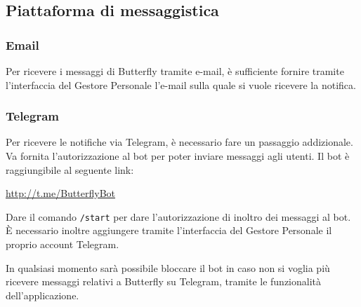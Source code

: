 \subsection{Piattaforma di messaggistica}

\subsubsection{Email}

Per ricevere i messaggi di Butterfly tramite e-mail, è sufficiente fornire tramite l'interfaccia del Gestore Personale l'e-mail sulla
quale si vuole ricevere la notifica.

\subsubsection{Telegram}

Per ricevere le notifiche via Telegram, è necessario fare un passaggio addizionale. Va fornita l'autorizzazione al bot per poter inviare messaggi
agli utenti. Il bot è raggiungibile al seguente link:
\begin{center}
    \url{http://t.me/ButterflyBot}
\end{center}

Dare il comando \texttt{/start} per dare l'autorizzazione di inoltro dei messaggi al bot.
È necessario inoltre aggiungere tramite l'interfaccia del Gestore Personale il proprio account Telegram.

In qualsiasi momento sarà possibile bloccare il bot in caso non si voglia più ricevere messaggi relativi a
Butterfly su Telegram, tramite le funzionalità dell'applicazione.
